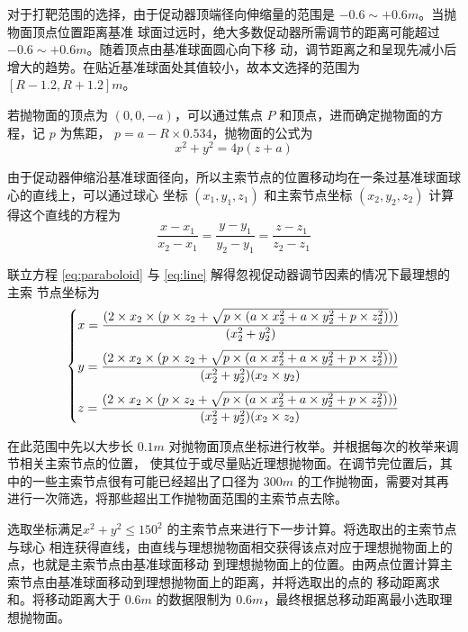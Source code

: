 \documentclass[withoutpreface,bwprint]{cumcmthesis} %
\begin{document}
对于打靶范围的选择，由于促动器顶端径向伸缩量的范围是 $-0.6\sim +0.6m$。当抛物面顶点位置距离基准
球面过远时，绝大多数促动器所需调节的距离可能超过 $-0.6\sim +0.6m$。随着顶点由基准球面圆心向下移
动，调节距离之和呈现先减小后增大的趋势。在贴近基准球面处其值较小，故本文选择的范围为$\left[R-1.2,
R+1.2\right]m$。

若抛物面的顶点为 $(0,0,-a)$，可以通过焦点 $P$ 和顶点，进而确定抛物面的方程，记 $p$ 为焦距，
$p = a-R \times 0.534$，抛物面的公式为
\begin{equation}
    \label{eq:paraboloid}
    x^2 + y^2 = 4p(z + a)
\end{equation}

由于促动器伸缩沿基准球面径向，所以主索节点的位置移动均在一条过基准球面球心的直线上，可以通过球心
坐标 $(x_1,y_1,z_1)$ 和主索节点坐标 $(x_2,y_2,z_2)$ 计算得这个直线的方程为
\begin{equation}
    \label{eq:line}
    \frac{\displaystyle x - x_1}{\displaystyle x_2 - x_1} = \frac{\displaystyle y - y_1}
    {\displaystyle y_2 - y_1} = \frac{\displaystyle z - z_1}{\displaystyle z_2 - z_1}
\end{equation}

联立方程 \eqref{eq:paraboloid} 与 \eqref{eq:line} 解得忽视促动器调节因素的情况下最理想的主索
节点坐标为
\[
\begin{dcases}
    \smallskip
    x = \frac{(2\times x_2\times (p\times z_2 + \sqrt{p\times (a\times x_2^2 + a\times
    y_2^2 + p\times z_2^2)}))}{(x_2^2 + y_2^2)}  \\
    \smallskip
    y = \frac{(2\times x_2\times (p\times z_2 + \sqrt{p\times (a\times x_2^2 + a\times
    y_2^2 + p\times z_2^2)}))}{(x_2^2 + y_2^2)(x_2 \times y_2)}  \\
    z = \frac{(2\times x_2\times (p\times z_2 + \sqrt{p\times (a\times x_2^2 + a\times
    y_2^2 + p\times z_2^2)}))}{(x_2^2 + y_2^2)(x_2 \times z_2)}  \\
\end{dcases}
\]

在此范围中先以大步长 $0.1m$ 对抛物面顶点坐标进行枚举。并根据每次的枚举来调节相关主索节点的位置，
使其位于或尽量贴近理想抛物面。在调节完位置后，其中的一些主索节点很有可能已经超出了口径为 $300m$
的工作抛物面，需要对其再进行一次筛选，将那些超出工作抛物面范围的主索节点去除。

选取坐标满足$x^2 + y^2 \leqslant 150^2$ 的主索节点来进行下一步计算。将选取出的主索节点与球心
相连获得直线，由直线与理想抛物面相交获得该点对应于理想抛物面上的点，也就是主索节点由基准球面移动
到理想抛物面上的位置。由两点位置计算主索节点由基准球面移动到理想抛物面上的距离，并将选取出的点的
移动距离求和。将移动距离大于 $0.6m$ 的数据限制为 $0.6m$，最终根据总移动距离最小选取理想抛物面。
\end{document}
